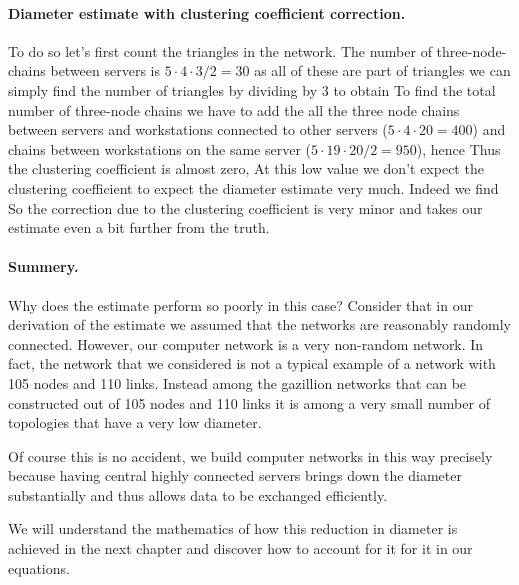 \paragraph{Diameter estimate with clustering coefficient correction.}To do so let's first count the triangles in the network. The number of three-node-chains between servers is $5\cdot 4 \cdot 3 / 2 = 30$ as all of these are part of triangles we can simply find the number of triangles by dividing by 3 to obtain 
To find the total number of three-node chains we have to add the all the three node chains between servers and workstations connected to other servers ($5\cdot 4 \cdot 20=400$) and chains between workstations on the same server ($5 \cdot 19 \cdot 20/2=950$), hence 
Thus the clustering coefficient is almost zero, 
At this low value we don't expect the clustering coefficient to expect the diameter estimate very much. Indeed we find 
So the correction due to the clustering coefficient is very minor and takes our estimate even a bit further from the truth. 

\paragraph{Summery.} Why does the estimate perform so poorly in this case? Consider that in our derivation of the estimate we assumed that the networks are reasonably randomly connected. However, our computer network is a very non-random network. In fact, the network that we considered is not a typical example of a network with 105 nodes and 110 links. Instead among the gazillion networks that can be constructed out of 105 nodes and 110 links it is among a very small number of topologies that have a very low diameter. 

Of course this is no accident, we build computer networks in this way precisely because having central highly connected servers brings down the diameter substantially and thus allows data to be exchanged efficiently. 

We will understand the mathematics of how this reduction in diameter is achieved in the next chapter and discover how to account for it  for it in our equations. 
